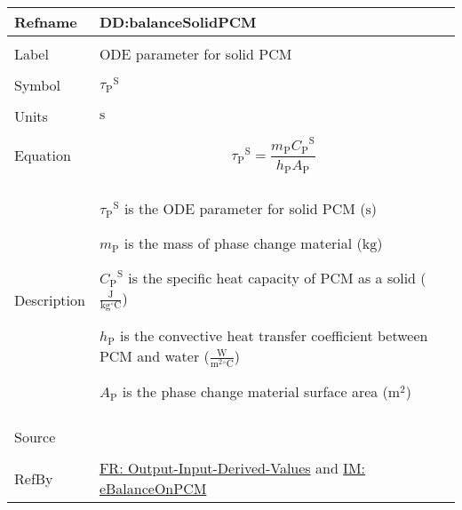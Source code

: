 \documentclass[12pt]{article}
\begin{document}
\vspace{\baselineskip}
\noindent
\begin{minipage}{\textwidth}
\begin{tabular}{>{\raggedright}p{}>{\raggedright\arraybackslash}p{}}
\toprule \textbf{Refname} & \textbf{DD:balanceSolidPCM}
\label{DD:balanceSolidPCM}
\\ \midrule \\
Label & ODE parameter for solid PCM
        
\\ \midrule \\
Symbol & ${{τ_{\text{P}}}^{\text{S}}}$
         
\\ \midrule \\
Units & ${\text{s}}$
        
\\ \midrule \\
Equation & \begin{displaymath}
           {{τ_{\text{P}}}^{\text{S}}}=\frac{{m_{\text{P}}} {{C_{\text{P}}}^{\text{S}}}}{{h_{\text{P}}} {A_{\text{P}}}}
           \end{displaymath}
\\ \midrule \\
Description & \begin{symbDescription}
              \item{${{τ_{\text{P}}}^{\text{S}}}$ is the ODE parameter for solid PCM (${\text{s}}$)}
              \item{${m_{\text{P}}}$ is the mass of phase change material (${\text{kg}}$)}
              \item{${{C_{\text{P}}}^{\text{S}}}$ is the specific heat capacity of PCM as a solid ($\frac{\text{J}}{\text{kg}{}^{\circ}\text{C}}$)}
              \item{${h_{\text{P}}}$ is the convective heat transfer coefficient between PCM and water ($\frac{\text{W}}{\text{m}^{2}{}^{\circ}\text{C}}$)}
              \item{${A_{\text{P}}}$ is the phase change material surface area (${\text{m}^{2}}$)}
              \end{symbDescription}
\\ \midrule \\
Source & \cite{lightstone2012}
         
\\ \midrule \\
RefBy & \hyperref[outputInputDerivVals]{FR: Output-Input-Derived-Values} and \hyperref[IM:eBalanceOnPCM]{IM: eBalanceOnPCM}
        
\\ \bottomrule
\end{tabular}
\end{minipage}
\end{document}
